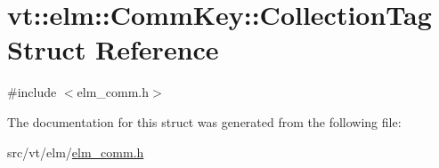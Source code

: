 \hypertarget{structvt_1_1elm_1_1_comm_key_1_1_collection_tag}{}\section{vt\+:\+:elm\+:\+:Comm\+Key\+:\+:Collection\+Tag Struct Reference}
\label{structvt_1_1elm_1_1_comm_key_1_1_collection_tag}


{\ttfamily \#include $<$elm\+\_\+comm.\+h$>$}



The documentation for this struct was generated from the following file\+:\begin{DoxyCompactItemize}
\item 
src/vt/elm/\hyperlink{elm__comm_8h}{elm\+\_\+comm.\+h}\end{DoxyCompactItemize}
